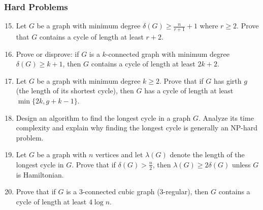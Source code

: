 \documentclass{article}
\theoremstyle{definition}
\begin{document}
\subsubsection{Hard Problems}
\begin{enumerate}\setcounter{enumi}{14}
\item Let $G$ be a graph with minimum degree $\delta(G) \geq \frac{n}{r+1} + 1$ where $r \geq 2$. Prove that $G$ contains a cycle of length at least $r+2$.

\item Prove or disprove: if $G$ is a $k$-connected graph with minimum degree $\delta(G) \geq k+1$, then $G$ contains a cycle of length at least $2k+2$.

\item Let $G$ be a graph with minimum degree $k \geq 2$. Prove that if $G$ has girth $g$ (the length of its shortest cycle), then $G$ has a cycle of length at least $\min\{2k, g+k-1\}$.

\item Design an algorithm to find the longest cycle in a graph $G$. Analyze its time complexity and explain why finding the longest cycle is generally an NP-hard problem.

\item Let $G$ be a graph with $n$ vertices and let $\lambda(G)$ denote the length of the longest cycle in $G$. Prove that if $\delta(G) > \frac{n}{2}$, then $\lambda(G) \geq 2\delta(G)$ unless $G$ is Hamiltonian.

\item Prove that if $G$ is a 3-connected cubic graph (3-regular), then $G$ contains a cycle of length at least $4\log n$.
\end{enumerate}
\end{document}

